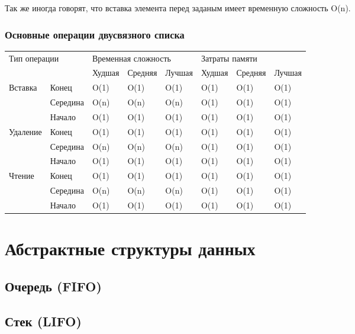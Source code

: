 Так же иногда говорят, что вставка элемента перед заданым имеет временную сложность O(n).
			\subsubsection{Основные операции двусвязного списка}
\begin{table}[h!]
\begin{tabular}{|l|l|l|l|l|l|l|l|}
\hline
\multicolumn{2}{|l|}{\multirow{2}{*}{Тип операции}} & \multicolumn{3}{l|}{Временная сложность} & \multicolumn{3}{l|}{Затраты памяти} \\ \cline{3-8} 
\multicolumn{2}{|l|}{}                  & Худшая & Средняя & Лучшая & Худшая & Средняя & Лучшая		\\ \hline
\multirow{3}{*}{Вставка}     & Конец 	& O(1) 	 & O(1)    & O(1)   & O(1)   & O(1)    & O(1)		\\ \cline{2-8} 
                             & Середина & O(n) 	 & O(n)    & O(n)   & O(1)   & O(1)    & O(1)		\\ \cline{2-8} 
                             & Начало 	& O(1) 	 & O(1)    & O(1)   & O(1)   & O(1)    & O(1)		\\ \hline
\multirow{3}{*}{Удаление}    & Конец 	& O(1) 	 & O(1)    & O(1)   & O(1)   & O(1)    & O(1)		\\ \cline{2-8} 
                             & Середина & O(n) 	 & O(n)    & O(n)   & O(1)   & O(1)    & O(1)		\\ \cline{2-8} 
                             & Начало 	& O(1) 	 & O(1)    & O(1)   & O(1)   & O(1)    & O(1)		\\ \hline
\multirow{3}{*}{Чтение}      & Конец 	& O(1) 	 & O(1)    & O(1)   & O(1)   & O(1)    & O(1)		\\ \cline{2-8} 
                             & Середина & O(n) 	 & O(n)    & O(n)   & O(1)   & O(1)    & O(1)		\\ \cline{2-8} 
                             & Начало 	& O(1) 	 & O(1)    & O(1)   & O(1)   & O(1)    & O(1)		\\ \hline
							
\end{tabular}
\end{table}

	\section{Абстрактные структуры данных}
		\subsection{Очередь (FIFO) \label{struct:fifo}}
		\subsection{Стек (LIFO) \label{struct:lifo}}